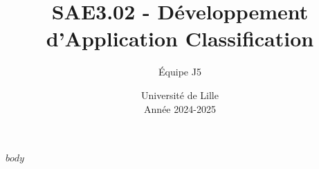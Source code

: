 \documentclass[a4paper,12pt]{article}
\begin{document}
\title{SAE3.02 - Développement d'Application Classification}
\author{Équipe J5}
\date{Université de Lille \\ Année 2024-2025}
\maketitle

\tableofcontents
\newpage

$body$
\end{document}
